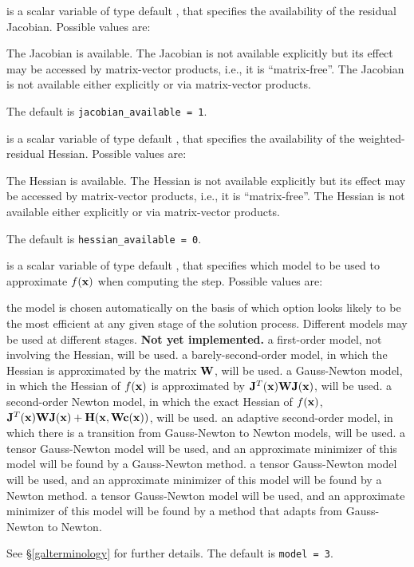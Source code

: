 \documentclass{galahad}
\begin{document}
\begin{description}
 is a scalar variable of type default \integer,
that specifies the availability of the residual Jacobian.
Possible values are:

\begin{description}
 The Jacobian is available.
 The Jacobian is not available explicitly but its effect
may be accessed by matrix-vector products, i.e., it is ``matrix-free''.
 The Jacobian is not available either explicitly or via
matrix-vector products.
\end{description}
The default is {\tt jacobian\_available = 1}.

 is a scalar variable of type default \integer,
that specifies the availability of the weighted-residual Hessian.
Possible values are:

\begin{description}
 The Hessian is available.
 The Hessian is not available explicitly but its effect
may be accessed by matrix-vector products, i.e., it is ``matrix-free''.
 The Hessian is not available either explicitly or via
matrix-vector products.
\end{description}
The default is {\tt hessian\_available = 0}.

 is a scalar variable of type default \integer, that specifies
which model to be used to approximate $f({\mathbf{x}})$ when computing the step.
Possible values are:

\begin{description}
 the model is chosen automatically on the basis of which option
        looks likely to be the most efficient at any given stage of the
        solution process. Different models may be used at different stages.
        {\bf Not yet implemented.}
 a first-order model, not involving the Hessian, will be used.
 a barely-second-order model, in which the Hessian is approximated
        by the matrix ${\mathbf{W}}$, will be used.
 a Gauss-Newton model, in which the Hessian of $f({\mathbf{x}})$
        is approximated by ${\mathbf{J}}^T({\mathbf{x}}) {\mathbf{W}} {\mathbf{J}}({\mathbf{x}})$, will be used.
 a second-order Newton model, in which the exact Hessian of $f({\mathbf{x}})$,
${\mathbf{J}}^T({\mathbf{x}}) {\mathbf{W}} {\mathbf{J}}({\mathbf{x}}) + {\mathbf{H}}({\mathbf{x}},{\mathbf{W}} {\mathbf{c}}({\mathbf{x}}))$,
will be used.
 an adaptive second-order model, in which there is a transition from
         Gauss-Newton to Newton models, will be used.
 a tensor Gauss-Newton model will be used, and an approximate minimizer
of this model will be found by a Gauss-Newton method.
 a tensor Gauss-Newton model will be used, and an approximate minimizer
of this model will be found by a Newton method.
 a tensor Gauss-Newton model will be used, and an approximate
 minimizer
of this model will be found by a method that adapts from Gauss-Newton to Newton.
\end{description}
See \S\ref{galterminology} for further details.
The default is {\tt model = 3}.


\end{description}
\end{document}
